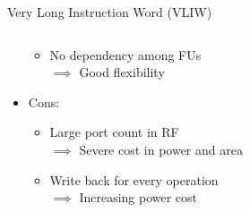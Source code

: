\documentclass[handout]{beamer}
\begin{document}
\begin{CJK}{UTF8}{bkai}
\begin{frame}{Very Long Instruction Word (VLIW)}
\begin{columns}
\begin{column}{0.6\textwidth}
\begin{itemize}
{\begin{itemize}
                                        \item No dependency among FUs \\ $\implies$ Good flexibility
                                    \end{itemize}
                                }
                            \item <4-> {Cons:
                                    \begin{itemize}
                                        \item Large port count in RF \\ $\implies$ Severe cost in power and area
                                        \item Write back for every operation \\ $\implies$ Increasing power cost
                                    \end{itemize}
                                }
                        \end{itemize} 
                    \end{column}
                \end{columns} 
            \end{frame}


\end{CJK}
\end{document}
